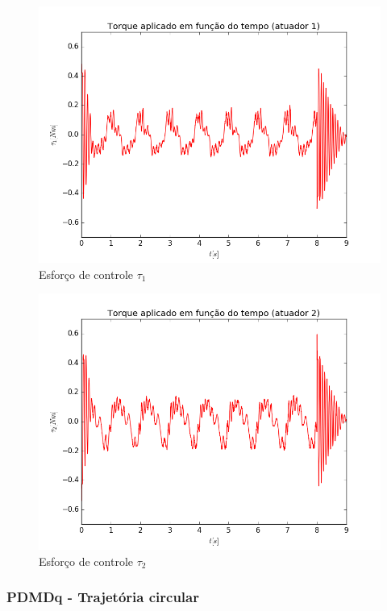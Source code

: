 \documentclass[]{politex}
\begin{document}
\begin{multicols}{2}
\begin{figure}[H]
	\centering
	\includegraphics[scale=0.39]{../../../Experimental/Aquisicoes/PIDt_circulo/tau1.png}  
	\caption{Esforço de controle $\tau_1$}
	\label{fig:PIDq_circulo_tau1}
\end{figure}
\begin{figure}[H]
	\centering
	\includegraphics[scale=0.39]{../../../Experimental/Aquisicoes/PIDt_circulo/tau2.png}  
	\caption{Esforço de controle $\tau_2$}
	\label{fig:PIDq_circulo_tau2}
\end{figure}
\end{multicols}

\subsubsection{PDMDq - Trajetória circular}
\end{document}
